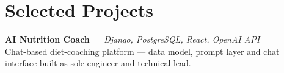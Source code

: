 
\section{Selected Projects}


\projecticon\textbf{AI Nutrition Coach} ~\softtext{\textbullet}~ {\small \textit{Django, PostgreSQL, React, OpenAI API}} \hfill {\small {}} \\
{\small Chat-based diet-coaching platform --- data model, prompt layer and chat interface built as sole engineer and technical lead.}

